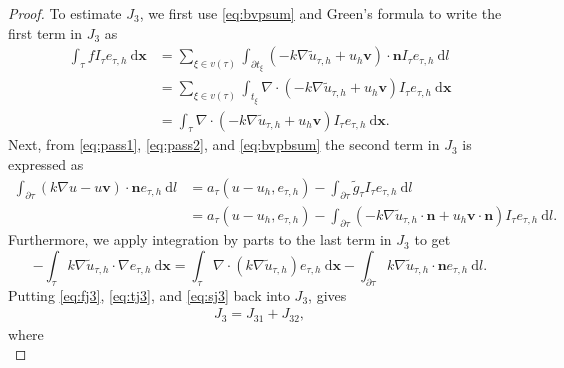 \documentclass[times]{nlaauth}
\numberwithin{equation}{section}
\begin{document}
\begin{proof}
\noindent
To estimate $J_3$, we first use \eqref{eq:bvpsum} and Green's formula to write
the first term in $J_3$ as
\begin{equation} \label{eq:fj3}
\begin{aligned}
\int_\tau f I_\tau e_{\tau, h} \ \text{d} \boldsymbol{x} &=
 \sum_{\xi\in v(\tau)} \int_{\partial t_\xi} ( -k \nabla \widetilde u_{\tau, h}  + u_h \boldsymbol{v})\cdot \boldsymbol{n} I_\tau e_{\tau, h}  \ \text{d} l \\
&= \sum_{\xi\in v(\tau)} \int_{t_\xi} \nabla \cdot ( -k \nabla \widetilde u_{\tau, h}  + u_h \boldsymbol{v}) I_\tau e_{\tau, h}  \ \text{d} \boldsymbol{x} \\
&=\int_{\tau} \nabla \cdot ( -k \nabla \widetilde u_{\tau, h}  + u_h \boldsymbol{v}) I_\tau e_{\tau, h}  \ \text{d} \boldsymbol{x}.
\end{aligned}
\end{equation}
Next, from \eqref{eq:pass1}, \eqref{eq:pass2},
and \eqref{eq:bvpbsum} the second term in $J_3$ is expressed as
\begin{equation} \label{eq:tj3}
\begin{aligned}
\int_{\partial\tau} ( k\nabla u - u\boldsymbol{v})  \cdot \boldsymbol{n} e_{\tau, h} \ \text{d} l &= a_\tau(u-u_h, e_{\tau, h}) - \int_{\partial \tau}  \widetilde g_\tau I_\tau e_{\tau, h} \ \text{d} l \\
&= a_\tau(u-u_h, e_{\tau, h}) - 
\int_{\partial \tau} ( - k \nabla \widetilde u_{\tau, h} \cdot \boldsymbol{n} + u_h \boldsymbol{v} \cdot \boldsymbol{n} ) I_\tau e_{\tau, h} \ \text{d} l.
\end{aligned}
\end{equation}
Furthermore, we apply integration by parts to the last term in $J_3$ to get
\begin{equation} \label{eq:sj3}
- \int_\tau k \nabla \widetilde u_{\tau, h}  \cdot \nabla e_{\tau, h} \ \text{d} \boldsymbol{x} = \int_\tau \nabla \cdot (k \nabla \widetilde u_{\tau, h} ) e_{\tau, h} \ \text{d} \boldsymbol{x} - 
\int_{\partial \tau} k \nabla \widetilde u_{\tau, h}  \cdot \boldsymbol{n} e_{\tau, h} \ \text{d} l.
\end{equation}
Putting \eqref{eq:fj3}, \eqref{eq:tj3}, and \eqref{eq:sj3} back into $J_3$, gives
\begin{equation*}
\begin{aligned}
J_3 = J_{31} + J_{32},
\end{aligned}
\end{equation*}
where
\begin{equation*}

\end{equation*}
\end{proof}
\end{document}

